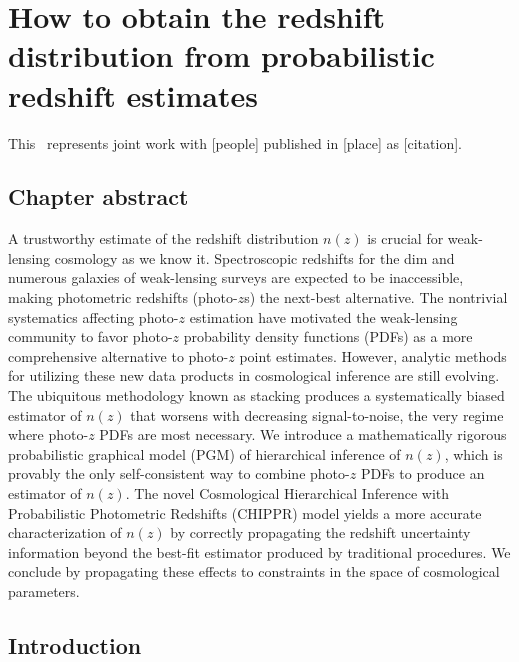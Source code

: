 \renewcommand{\chapid}{chippr}

\newcommand{\Chippr}{\project{CHIPPR}}

\newcommand{\Nz}{$N(z)$}
\newcommand{\nz}{$n(z)$}
\newcommand{\ndphi}{\ensuremath{\vec{\phi}}}%
\newcommand{\data}{\ensuremath{\vec{d}}}%

\chapter{How to obtain the redshift distribution from probabilistic redshift estimates}

This \paper\ represents joint work with [people] published in [place] as [citation].

\section{Chapter abstract}

A trustworthy estimate of the redshift distribution $n(z)$ is crucial for weak-lensing cosmology as we know it.
Spectroscopic redshifts for the dim and numerous galaxies of weak-lensing surveys are expected to be inaccessible, making photometric redshifts (photo-$z$s) the next-best alternative.
The nontrivial systematics affecting photo-$z$ estimation have motivated the weak-lensing community to favor photo-$z$ probability density functions (PDFs) as a more comprehensive alternative to photo-$z$ point estimates.
However, analytic methods for utilizing these new data products in cosmological inference are still evolving.
The ubiquitous methodology known as stacking produces a systematically biased estimator of $n(z)$ that worsens with decreasing signal-to-noise, the very regime where photo-$z$ PDFs are most necessary.
We introduce a mathematically rigorous probabilistic graphical model (PGM) of hierarchical inference of $n(z)$, which is provably the only self-consistent way to combine photo-$z$ PDFs to produce an estimator of $n(z)$.
The novel Cosmological Hierarchical Inference with Probabilistic Photometric Redshifts (CHIPPR) model yields a more accurate characterization of $n(z)$ by correctly propagating the redshift uncertainty information beyond the best-fit estimator produced by traditional procedures.
We conclude by propagating these effects to constraints in the space of cosmological parameters.

\section{Introduction}

